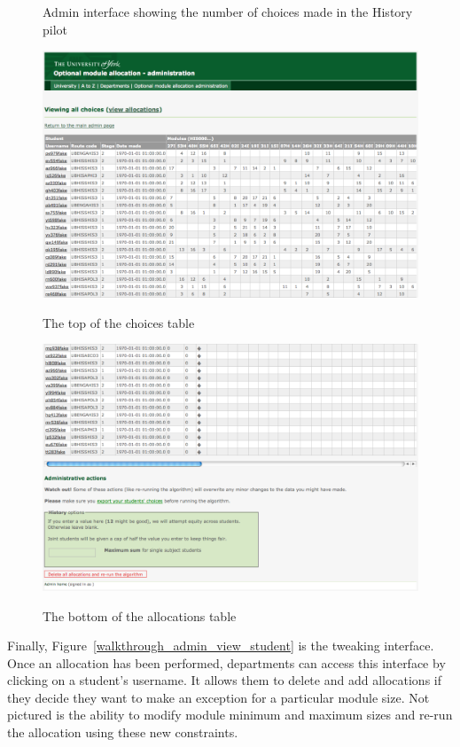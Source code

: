 \begin{figure}
\begin{minipage}[]{0.33\linewidth}
    \caption{Admin interface showing the number of choices made in the History pilot}
    \label{walkthrough_admin_view_all_choices}
  \end{minipage}
  \hspace{0.1cm}
  \begin{minipage}[]{0.63\linewidth}
    \centering
    \includegraphics[width=0.9\linewidth]{images/walkthrough/admin_view_all_choices_visible.png}
    \caption{The top of the choices table}
    \label{walkthrough_admin_view_all_choices_visible}
    \bigskip
    \includegraphics[width=0.9\linewidth]{images/walkthrough/admin_view_all_allocations_bottom.png}
    \caption{The bottom of the allocations table}
    \label{walkthrough_admin_view_all_allocations_bottom}
  \end{minipage}
\end{figure}

Finally, Figure~\ref{walkthrough_admin_view_student} is the tweaking
interface. Once an allocation has been performed, departments can access this
interface by clicking on a student's username. It allows them to delete and
add allocations if they decide they want to make an exception for a particular
module size. Not pictured is the ability to modify module minimum and maximum
sizes and re-run the allocation using these new constraints.

